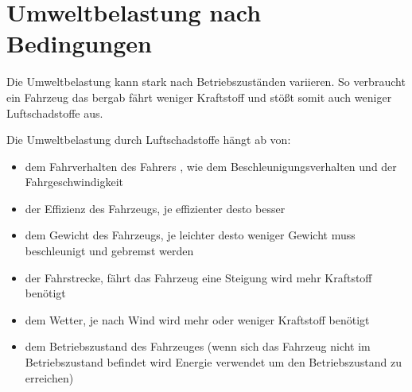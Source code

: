 
\section{Umweltbelastung nach Bedingungen}
Die Umweltbelastung kann stark nach Betriebszuständen variieren.
So verbraucht ein Fahrzeug das bergab fährt weniger Kraftstoff und stößt somit auch weniger Luftschadstoffe aus.

Die Umweltbelastung durch Luftschadstoffe hängt ab von:
\begin{itemize}
	\item dem Fahrverhalten des Fahrers , wie dem Beschleunigungsverhalten und der Fahrgeschwindigkeit
	\item der Effizienz des Fahrzeugs, je effizienter desto besser
	\item dem Gewicht des Fahrzeugs, je leichter desto weniger Gewicht muss beschleunigt und gebremst werden
	\item der Fahrstrecke, fährt das Fahrzeug eine Steigung wird mehr Kraftstoff benötigt
	\item dem Wetter, je nach Wind wird mehr oder weniger Kraftstoff benötigt
	\item dem Betriebszustand des Fahrzeuges (wenn sich das Fahrzeug nicht im Betriebszustand befindet wird Energie verwendet um den Betriebszustand zu erreichen)
\end{itemize}

